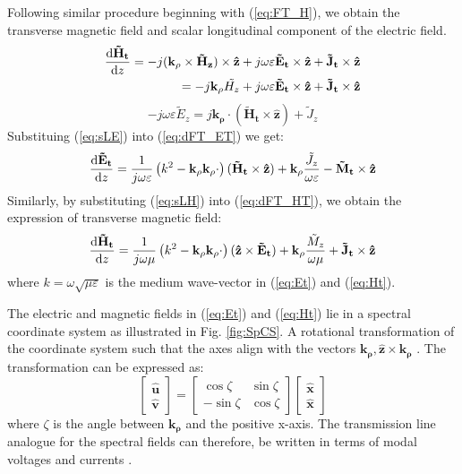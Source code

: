 \documentclass[11pt]{article}
\renewcommand{\v}[1]{\mathbf{#1}} %
\newcommand{\ti}[1]{\tilde{#1}} %
\renewcommand{\O}{\omega}  %
\newcommand{\E}{\varepsilon}  %
\renewcommand{\u}{\mu}  %
\newcommand{\p}{\rho}  %
\newcommand{\x}{\times}  %
\renewcommand{\^}{\hat}  %
\begin{document}
  Following similar procedure beginning with (\ref{eq:FT_H}), we obtain the transverse magnetic field and scalar longitudinal component of the electric field.
  \begin{equation}
    \begin{split}
      \dv{\v{\ti{H}_t}}{z} = -j (\v{k_{\p}} \x \v{\ti{H}_z}) \x \v{\^{z}}
      + j \O \E \v{\ti{E}_t} \x \v{\^{z}} +
      \v{\ti{J}_t} \x \v{\^{z}} \\
      = -j \v{k_{\p}} \ti{{H}_z} + j \O \E \v{\ti{E}_t} \x \v{\^{z}}  +
      \v{\ti{J}_t} \x \v{\^{z}}
    \end{split}
    \label{eq:dFT_HT}
  \end{equation}
  \begin{equation}
    -j \O \E \ti{E}_z =
    j \v{k_{\p}} \cdot (\v{\ti{H}_t} \x \v{\^{z}}) + {\ti{J}_z}
    \label{eq:sLE}
  \end{equation}
  Substituing (\ref{eq:sLE}) into (\ref{eq:dFT_ET}) we get:
  \begin{equation}
    \dv{\v{\ti{E}_t}}{z} =
    \frac{1}{j \O \E} \left( k^2 - \v{k_{\p}}\v{k_{\p}} \cdot \right) (\v{\ti{H}_t} \x \v{\^{z}}) + \v{k_{\p}} \frac{\ti{J}_z}{\O \E} - \v{\ti{M}_t}
    \x \v{\^{z}}
    \label{eq:Et}
  \end{equation}
  Similarly, by substituting (\ref{eq:sLH}) into (\ref{eq:dFT_HT}), we obtain the expression of transverse magnetic field:
  \begin{equation}
    \dv{\v{\ti{H}_t}}{z} =
    \frac{1}{j \O \u} \left( k^2 - \v{k_{\p}}\v{k_{\p}} \cdot \right) (\v{\^{z}} \x \v{\ti{E}_t}) + \v{k_{\p}} \frac{\ti{M}_z}{\O \u} + \v{\ti{J}_t}
    \x \v{\^{z}}
    \label{eq:Ht}
  \end{equation}
  where $k = \O \sqrt{\u \E}$ is the medium wave-vector in (\ref{eq:Et}) and (\ref{eq:Ht}).

  The electric and magnetic fields in (\ref{eq:Et}) and (\ref{eq:Ht}) lie in a spectral coordinate system as illustrated in Fig. \ref{fig:SpCS}. A rotational transformation of the coordinate system such that the axes align with the vectors $\v{k_{\p}}, \v{\^z} \x \v{k_{\p}}$ \cite{itoh1980spectral}. The transformation can be expressed as:
  \begin{equation}
    \left[\begin{array}{c}
    \v{\^u} \\
    \v{\^v}
    \end{array} \right]
    = \left[ \begin{array}{cc}
    \cos \zeta & \sin \zeta \\
    -\sin \zeta & \cos \zeta
    \end{array} \right]
    \left[\begin{array}{c}
    \v{\^x} \\
    \v{\^x}
    \end{array} \right]
    \label{eq:xtion}
  \end{equation}
  where $\zeta$ is the angle between $\v{k_{\p}}$ and the positive x-axis. The transmission line analogue for the spectral fields can therefore, be written in terms of modal voltages and currents \cite{kastner1988spectral, michalski1997multilayered}.
\end{document}
